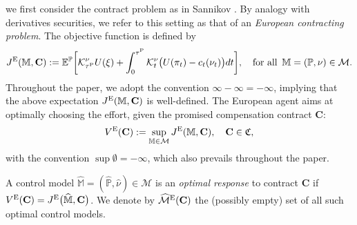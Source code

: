 \documentclass[11pt,a4paper]{article}
\numberwithin{equation}{section}
\def\dbE{\mathbb{E}}
\def\dbM{\mathbb{M}}
\def\dbP{\mathbb{P}}
\newcommand{\cK}{\mathcal{K}}
\newcommand{\cM}{\mathcal{M}}
\newcommand{\Cbf}{\mathbf{C}}
\def\no{\noindent}
\newcommand{\beaa}{\begin{eqnarray*}}
\newcommand{\eeaa}{\end{eqnarray*}}
\theoremstyle{definition}
\begin{document}
\vspace{3mm}
 
\no {\bf Agent cannot quit:} we first consider the contract problem as in Sannikov \cite{Sannikov08}. By analogy with derivatives securities, we refer to this setting as that of an {\it European contracting problem}. 
The objective function is defined by
 \begin{equation}\label{JE}
   J^{\rm E}(\dbM,\Cbf)
   :=  \dbE^{\dbP}\bigg[\cK^{\nu}_{\tau^{\scriptscriptstyle\rm P}} U(\xi)
                                    +\int_0^{\tau^{\scriptscriptstyle\rm P}} \mathcal K^{\nu}_t \big(U(\pi_t)-c_t(\nu_t)\big)dt \bigg],
   \quad \mbox{for all}\,\,\,
   \dbM=(\dbP,\nu)\in\cM.
 \end{equation}
Throughout the paper, we adopt the convention $\infty-\infty=-\infty$, implying that the above expectation $J^{\rm E}(\dbM,\Cbf)$ is well-defined. 
The European agent aims at optimally choosing the effort, given the promised compensation contract $\Cbf$:
 \beaa\label{EuroAgent}
    V^{\rm E}(\Cbf) := \sup_{\dbM\in\cM} J^{\rm E}(\dbM,\Cbf), \quad \Cbf\in\mathfrak{C},
 \eeaa
with the convention $\sup\emptyset=-\infty$, which also prevails throughout the paper. 

A control model $\widehat{\dbM}=(\widehat{\dbP},\widehat{\nu})\in\cM$ is an {\it optimal response} to contract $\Cbf$ if $V^{\rm E}(\Cbf)=J^{\rm E}\big(\widehat{\dbM},\Cbf\big)$. 
We denote by $\widehat{\cM}^{\rm E}(\Cbf)$ the (possibly empty) set of all such optimal control models.

\vspace{3mm}
\end{document}
